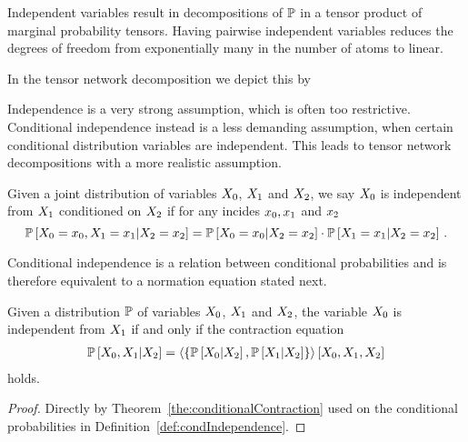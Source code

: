 Independent variables result in decompositions of $\mathbb{P}$ in a tensor product of marginal probability tensors. 
Having pairwise independent variables reduces the degrees of freedom from exponentially many in the number of atoms to linear.

In the tensor network decomposition we depict this by
	\begin{center}
		
	\end{center}

Independence is a very strong assumption, which is often too restrictive.
Conditional independence instead is a less demanding assumption, when certain conditional distribution variables are independent. 
This leads to tensor network decompositions with a more realistic assumption.

\begin{definition}\label{def:condIndependence}
	Given a joint distribution of variables $X_{0}$, $X_{1}$ and $X_{2}$, we say $X_{0}$ is independent from $X_{1}$ conditioned on $X_{2}$ if for any incides $x_{0},x_{1}$ and $x_{2}$
		\[ \mathbb{P}\left[X_{0}=x_{0},X_{1}=x_{1}|X_{2}=x_{2}\right] 
		= \mathbb{P}\left[X_{0}=x_{0}|X_{2}=x_{2}\right] 
		\cdot \mathbb{P}\left[X_{1}=x_{1}|X_{2}=x_{2}\right]   \, . \]
\end{definition}

Conditional independence is a relation between conditional probabilities and is therefore equivalent to a normation equation stated next.

\begin{theorem}\label{the:condIndependenceProductCriterion}
	Given a distribution $\mathbb{P}$ of variables $X_{0}$, $X_{1}$ and $X_{2}$, the variable $X_{0}$ is independent from $X_{1}$ if and only if the contraction equation
	\begin{align*}
		 \mathbb{P}\left[X_{0},X_{1}|X_{2}\right] 
		 = \left\langle \{
		 \mathbb{P}\left[X_{0}|X_{2}\right] ,\mathbb{P}\left[X_{1}|X_{2}\right] 
		 \}\right\rangle \left[ X_{0},X_{1},X_{2} \right]
	\end{align*}
	holds.
\end{theorem}
\begin{proof}
	Directly by Theorem~\ref{the:conditionalContraction} used on the conditional probabilities in Definition~\ref{def:condIndependence}.
\end{proof}

